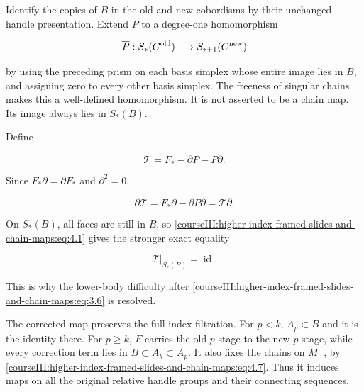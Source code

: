 Identify the copies of \(B\) in the old and new cobordisms by their unchanged handle presentation. Extend \(P\) to a degree-one homomorphism

\begin{equation}
\overline P:S_*(C^{\rm old})\longrightarrow S_{*+1}(C^{\rm new})
 \label{courseIII:higher-index-framed-slides-and-chain-maps:eq:4.4}
\end{equation}

by using the preceding prism on each basis simplex whose entire image lies in \(B\), and assigning zero to every other basis simplex. The freeness of singular chains makes this a well-defined homomorphism. It is not asserted to be a chain map. Its image always lies in \(S_*(B)\).

Define

\begin{equation}
\mathcal T=F_*-\partial\overline P-\overline P\partial .
 \label{courseIII:higher-index-framed-slides-and-chain-maps:eq:4.5}
\end{equation}

Since \(F_*\partial=\partial F_*\) and \(\partial^2=0\),

\begin{equation}
\partial\mathcal T
 =F_*\partial-\partial\overline P\partial
 =\mathcal T\partial.
 \label{courseIII:higher-index-framed-slides-and-chain-maps:eq:4.6}
\end{equation}

On \(S_*(B)\), all faces are still in \(B\), so \eqref{courseIII:higher-index-framed-slides-and-chain-maps:eq:4.1} gives the stronger exact equality

\begin{equation}
\mathcal T|_{S_*(B)}=\operatorname{id}.
 \label{courseIII:higher-index-framed-slides-and-chain-maps:eq:4.7}
\end{equation}

This is why the lower-body difficulty after \eqref{courseIII:higher-index-framed-slides-and-chain-maps:eq:3.6} is resolved.

The corrected map preserves the full index filtration. For \(p<k\), \(A_p\subset B\) and it is the identity there. For \(p\geq k\), \(F\) carries the old \(p\)-stage to the new \(p\)-stage, while every correction term lies in \(B\subset A_k\subset A_p\). It also fixes the chains on \(M_-\), by \eqref{courseIII:higher-index-framed-slides-and-chain-maps:eq:4.7}. Thus it induces maps on all the original relative handle groups and their connecting sequences.

